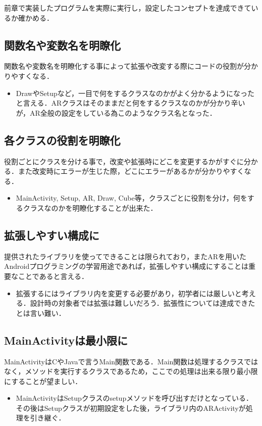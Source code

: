 前章で実装したプログラムを実際に実行し，設定したコンセプトを達成できているか確かめる．
\vspace{5pt}
\subsection{関数名や変数名を明瞭化}
関数名や変数名を明瞭化する事によって拡張や改変する際にコードの役割が分かりやすくなる．
\begin{itemize}
	\item DrawやSetupなど，一目で何をするクラスなのかがよく分かるようになったと言える．ARクラスはそのままだと何をするクラスなのかが分かり辛いが，AR全般の設定をしている為このようなクラス名となった．
\end{itemize}
\vspace{5pt}
\subsection{各クラスの役割を明瞭化}
役割ごとにクラスを分ける事で，改変や拡張時にどこを変更するかがすぐに分かる．また改変時にエラーが生じた際，どこにエラーがあるかが分かりやすくなる．
\begin{itemize}
	\item MainActivity, Setup, AR, Draw, Cube等，クラスごとに役割を分け，何をするクラスなのかを明瞭化することが出来た．
\end{itemize}
\vspace{5pt}
\subsection{拡張しやすい構成に}
提供されたライブラリを使ってできることは限られており，またARを用いたAndroidプログラミングの学習用途であれば，拡張しやすい構成にすることは重要なことであると言える．
\begin{itemize}
	\item 拡張するにはライブラリ内を変更する必要があり，初学者には厳しいと考える．設計時の対象者では拡張は難しいだろう．拡張性については達成できたとは言い難い．
\end{itemize}
\vspace{5pt}
\subsection{MainActivityは最小限に}
MainActivityはCやJavaで言うMain関数である．Main関数は処理するクラスではなく，メソッドを実行するクラスであるため，ここでの処理は出来る限り最小限にすることが望ましい．
\begin{itemize}
	\item MainActivityはSetupクラスのsetupメソッドを呼び出すだけとなっている．その後はSetupクラスが初期設定をした後，ライブラリ内のARActivityが処理を引き継ぐ．
\end{itemize}
